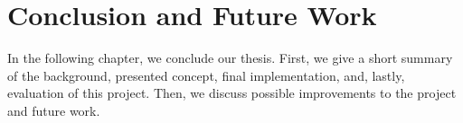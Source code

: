 \chapter{Conclusion and Future Work}
In the following chapter, we conclude our thesis. First, we give a short summary of the background, presented concept, final implementation, and, lastly, evaluation of this project. Then, we discuss possible improvements to the project and future work. 



